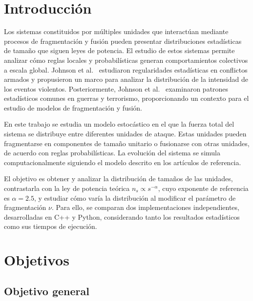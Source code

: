 \documentclass[
a4paper,
amsfonts,
amssymb,
amsmath,
reprint,
twoside
]{revtex4-1}
\begin{document}

\section{Introducción}

Los sistemas constituidos por múltiples unidades que interactúan
mediante procesos de fragmentación y fusión pueden presentar
distribuciones estadísticas de tamaño que siguen leyes de potencia.
El estudio de estos sistemas permite analizar cómo reglas locales
y probabilísticas generan comportamientos colectivos a escala
global. Johnson et al.~\cite{johnson2005} estudiaron regularidades
estadísticas en conflictos armados y propusieron un marco para
analizar la distribución de la intensidad de los eventos violentos.
Posteriormente, Johnson et al.~\cite{johnson2006} examinaron patrones
estadísticos comunes en guerras y terrorismo, proporcionando un
contexto para el estudio de modelos de fragmentación y fusión.

En este trabajo se estudia un modelo estocástico en el que la fuerza
total del sistema se distribuye entre diferentes unidades de ataque.
Estas unidades pueden fragmentarse en componentes de tamaño unitario
o fusionarse con otras unidades, de acuerdo con reglas probabilísticas.
La evolución del sistema se simula computacionalmente siguiendo el
modelo descrito en los artículos de referencia.

El objetivo es obtener y analizar la distribución de tamaños de las
unidades, contrastarla con la ley de potencia teórica
$n_s \propto s^{-\alpha}$, cuyo exponente de referencia es
$\alpha=2.5$, y estudiar cómo varía la distribución al modificar
el parámetro de fragmentación $\nu$. Para ello, se comparan dos
implementaciones independientes, desarrolladas en C++ y Python,
considerando tanto los resultados estadísticos como sus tiempos
de ejecución.



\section{Objetivos}

\subsection{Objetivo general}
\end{document}
